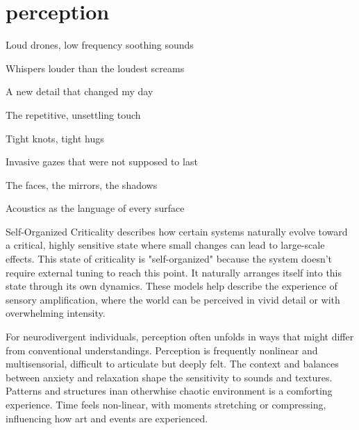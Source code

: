 \chapter*{perception}
\begin{center}
\vspace{2cm}
\begin{flushright}
Loud drones, low frequency soothing sounds

Whispers louder than the loudest screams

A new detail that changed my day

The repetitive, unsettling touch

Tight knots, tight hugs

Invasive gazes that were not supposed to last

The faces, the mirrors, the shadows

Acoustics as the language of every surface

\end{flushright}
\vspace{2cm}
\end{center}
\normalsize

Self-Organized Criticality describes how certain systems naturally evolve toward a critical, highly sensitive state where small changes can lead to large-scale effects. This state of criticality is "self-organized" because the system doesn’t require external tuning to reach this point. It naturally arranges itself into this state through its own dynamics. These models help describe the experience of sensory amplification, where the world can be perceived in vivid detail or with overwhelming intensity. \citep{adami1993}


For neurodivergent individuals, perception often unfolds in ways that might differ from conventional understandings. Perception is frequently nonlinear and multisensorial, difficult to articulate but deeply felt. The context and balances between anxiety and relaxation shape the sensitivity to sounds and textures. Patterns and structures inan otherwhise chaotic environment is a comforting experience. Time feels non-linear, with moments stretching or compressing, influencing how art and events are experienced. 

